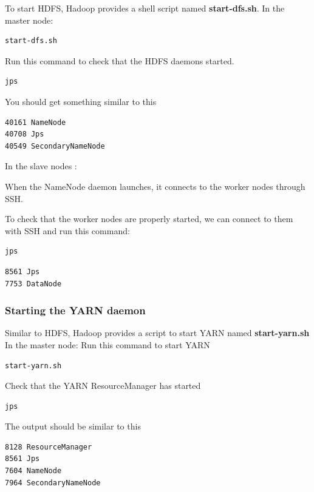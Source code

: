 \documentclass[12pt,english]{book}
\begin{document}
To start HDFS, Hadoop provides a shell script named \textbf{start-dfs.sh}.
In the master node:
\begin{lstlisting}[language=bash, frame=single, basicstyle=\footnotesize]
start-dfs.sh
\end{lstlisting}

Run this command to check that the HDFS daemons started.
\begin{lstlisting}[language=bash, frame=single, basicstyle=\footnotesize]
jps
\end{lstlisting}
You should get something similar to this
\begin{lstlisting}[language=bash, frame=single, basicstyle=\footnotesize]
40161 NameNode
40708 Jps
40549 SecondaryNameNode
\end{lstlisting}

In the slave nodes :

When the NameNode daemon launches, it connects to the worker nodes through SSH.

To check that the worker nodes are properly started, we can connect to them with SSH and run this command:
\begin{lstlisting}[language=bash, frame=single, basicstyle=\footnotesize]
jps
\end{lstlisting}

\begin{lstlisting}[language=bash, frame=single, basicstyle=\footnotesize]
8561 Jps
7753 DataNode
\end{lstlisting}

\subsubsection{Starting the YARN daemon}

Similar to HDFS, Hadoop provides a script to start YARN named \textbf{start-yarn.sh}
In the master node:
Run this command to start YARN
\begin{lstlisting}[language=bash, frame=single, basicstyle=\footnotesize]
start-yarn.sh
\end{lstlisting}

Check that the YARN ResourceManager has started
\begin{lstlisting}[language=bash, frame=single, basicstyle=\footnotesize]
jps
\end{lstlisting}
The output should be similar to this
\begin{lstlisting}[language=bash, frame=single, basicstyle=\footnotesize]
8128 ResourceManager
8561 Jps
7604 NameNode
7964 SecondaryNameNode
\end{lstlisting}
\end{document}
